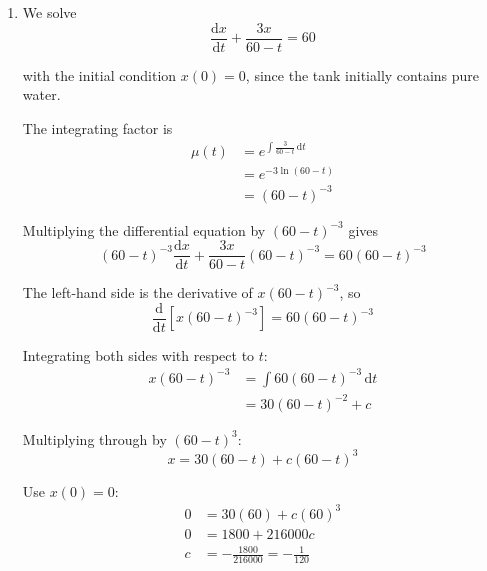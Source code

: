 \documentclass[leqno]{article}
\begin{document}
\begin{enumerate}[
  label=\textbf{\arabic*.},
  leftmargin=*,
  topsep=0pt,
  partopsep=0pt,
  parsep=0pt
]
\begin{djsSolution}
\begin{enumerate}[label=\textbf{(\alph*)}]
  This is valid while the tank still contains liquid, so $0\le t<60$.

  The rate at which salt enters is
  \[
  20\times 3=60\,\mathrm{g\,h^{-1}}
  \]

  The concentration of salt in the tank at time $t$ is
  \[
  \frac{x}{V}=\frac{x}{600-10t}\,\mathrm{g\,L^{-1}}
  \]

  Since the mixture leaves at $30\,\mathrm{L\,h^{-1}}$, the rate at which salt leaves is
  \[
  30\left(\frac{x}{600-10t}\right)=\frac{30x}{600-10t}=\frac{3x}{60-t}\,\mathrm{g\,h^{-1}}
  \]

  Hence
  \[
  \frac{\mathrm{d}x}{\mathrm{d}t}=\text{rate in}-\text{rate out}
  \]

  so
  \[
  \frac{\mathrm{d}x}{\mathrm{d}t}=60-\frac{3x}{60-t}
  \]

  as required.

  \item We solve
  \[
  \frac{\mathrm{d}x}{\mathrm{d}t}+\frac{3x}{60-t}=60
  \]

  with the initial condition $x(0)=0$, since the tank initially contains pure water.

  The integrating factor is
  \begin{align*}
  \mu(t)&=e^{\int \frac{3}{60-t}\,\mathrm{d}t} \\
       &=e^{-3\ln(60-t)} \\
       &=(60-t)^{-3}
  \end{align*}

  Multiplying the differential equation by $(60-t)^{-3}$ gives
  \[
  (60-t)^{-3}\frac{\mathrm{d}x}{\mathrm{d}t}+\frac{3x}{60-t}(60-t)^{-3}=60(60-t)^{-3}
  \]

  The left-hand side is the derivative of $x(60-t)^{-3}$, so
  \[
  \frac{\mathrm{d}}{\mathrm{d}t}\left[x(60-t)^{-3}\right]=60(60-t)^{-3}
  \]

  Integrating both sides with respect to $t$:
  \begin{align*}
  x(60-t)^{-3}&=\int 60(60-t)^{-3}\,\mathrm{d}t \\
  &=30(60-t)^{-2}+c
  \end{align*}

  Multiplying through by $(60-t)^3$:
  \[
  x=30(60-t)+c(60-t)^3
  \]

  Use $x(0)=0$:
  \begin{align*}
  0&=30(60)+c(60)^3 \\
  0&=1800+216000c \\
  c&=-\frac{1800}{216000}=-\frac{1}{120}
  \end{align*}


\end{enumerate}
\end{djsSolution}
\end{enumerate}
\end{document}

